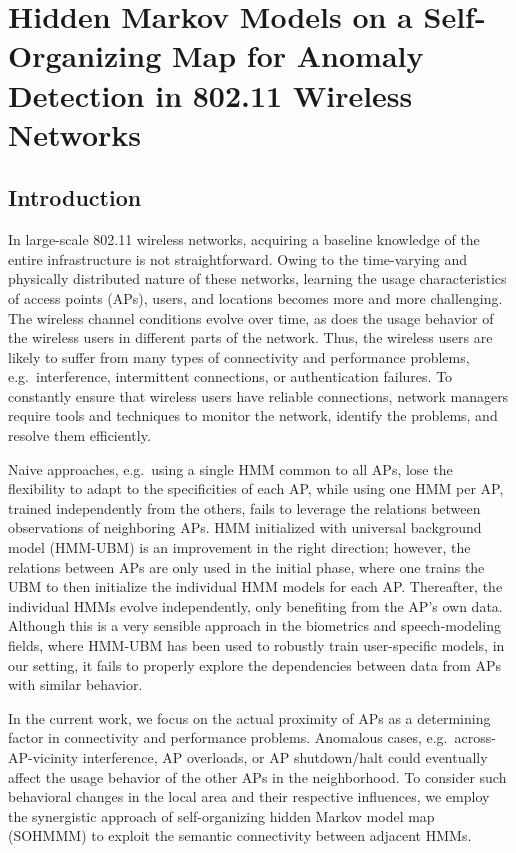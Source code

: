 \section{Hidden Markov Models on a Self-Organizing Map for Anomaly Detection in 802.11 Wireless Networks}
\label{sec:sohmmm}

\subsection{Introduction}
\label{sec:sohmmm_intro}
In large-scale 802.11 wireless networks, acquiring a baseline knowledge of the entire infrastructure is not straightforward. Owing to the time-varying and physically distributed nature of these networks, learning the usage characteristics of access points (APs), users, and locations becomes more and more challenging. The wireless channel conditions evolve over time, as does the usage behavior of the wireless users in different parts of the network. Thus, the wireless users are likely to suffer from many types of connectivity and performance problems, e.g.\ interference, intermittent connections, or authentication failures. To constantly ensure that wireless users have reliable connections, network managers require tools and techniques to monitor the network, identify the problems, and resolve them efficiently.

Naive approaches, e.g.\ using a single HMM common to all APs, lose the flexibility to adapt to the specificities of each AP, while using one HMM per AP, trained independently from the others, fails to leverage the relations between observations of neighboring APs. HMM initialized with universal background model (HMM-UBM) \cite{Anisa2017} is an improvement in the right direction; however, the relations between APs are only used in the initial phase, where one trains the UBM to then initialize the individual HMM models for each AP. Thereafter, the individual HMMs evolve independently, only benefiting from the AP's own data. Although this is a very sensible approach in the biometrics and speech-modeling fields, where HMM-UBM has been used to robustly train user-specific models, in our setting, it fails to properly explore the dependencies between data from APs with similar behavior. 

In the current work, we focus on the actual proximity of APs as a determining factor in connectivity and performance problems. Anomalous cases, e.g.\ across-AP-vicinity interference, AP overloads, or AP shutdown/halt could eventually affect the usage behavior of the other APs in the neighborhood. To consider such behavioral changes in the local area and their respective influences, we employ the synergistic approach of self-organizing hidden Markov model map (SOHMMM) to exploit the semantic connectivity between adjacent HMMs.

